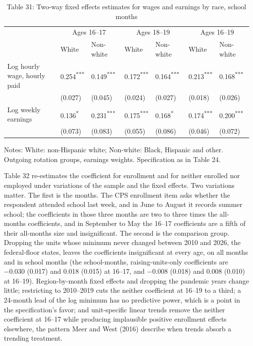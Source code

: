 \documentclass[12pt]{article}
\begin{document}
\begin{table}
\centering
\caption{Table 31: Two-way fixed effects estimates for wages and earnings by race, school months}

\small
\begin{tabular}{p{}p{}p{}p{}p{}p{}p{}}
\toprule
 & \multicolumn{2}{c}{Ages 16--17} & \multicolumn{2}{c}{Ages 18--19} & \multicolumn{2}{c}{Ages 16--19} \\

 & White & Non-white & White & Non-white & White & Non-white \\
\midrule
Log hourly wage, hourly paid & 0.254\textsuperscript{***} & 0.149\textsuperscript{***} & 0.172\textsuperscript{***} & 0.164\textsuperscript{***} & 0.213\textsuperscript{***} & 0.168\textsuperscript{***} \\
 & (0.027) & (0.045) & (0.024) & (0.027) & (0.018) & (0.026) \\
Log weekly earnings & 0.136\textsuperscript{*} & 0.231\textsuperscript{***} & 0.175\textsuperscript{***} & 0.168\textsuperscript{*} & 0.174\textsuperscript{***} & 0.200\textsuperscript{***} \\
 & (0.073) & (0.083) & (0.055) & (0.086) & (0.046) & (0.072) \\
\bottomrule
\end{tabular}



\noindent\small Notes: White: non-Hispanic white; Non-white: Black, Hispanic and other. Outgoing rotation groups, earnings weights. Specification as in Table 24.

\end{table}

Table 32 re-estimates the coefficient for enrollment and for neither enrolled nor employed under variations of the sample and the fixed effects. Two variations matter. The first is the months. The CPS enrollment item asks whether the respondent attended school last week, and in June to August it records summer school; the coefficients in those three months are two to three times the all-months coefficients, and in September to May the 16--17 coefficients are a fifth of their all-months size and insignificant. The second is the comparison group. Dropping the units whose minimum never changed between 2010 and 2026, the federal-floor states, leaves the coefficients insignificant at every age, on all months and in school months (the school-months, raising-units-only coefficients are $-0.030$ (0.017) and 0.018 (0.015) at 16--17, and $-0.008$ (0.018) and 0.008 (0.010) at 16--19). Region-by-month fixed effects and dropping the pandemic years change little; restricting to 2010--2019 cuts the neither coefficient at 16--19 to a third; a 24-month lead of the log minimum has no predictive power, which is a point in the specification's favor; and unit-specific linear trends remove the neither coefficient at 16--17 while producing implausible positive enrollment effects elsewhere, the pattern Meer and West (2016) describe when trends absorb a trending treatment.
\end{document}
